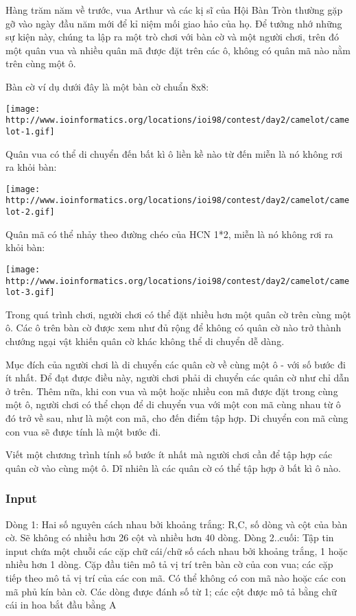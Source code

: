 

Hàng trăm năm về trước, vua Arthur và các kị sĩ của Hội Bàn Tròn thường gặp gỡ vào ngày đầu năm mới để kỉ niệm mối giao hảo của họ. Để tưởng nhớ những sự kiện này, chúng ta lập ra một trò chơi với bàn cờ và một người chơi, trên đó một quân vua và nhiều quân mã được đặt trên các ô, không có quân mã nào nằm trên cùng một ô.

Bàn cờ ví dụ dưới đây là một bàn cờ chuẩn 8x8:


\texttt{[image: http://www.ioinformatics.org/locations/ioi98/contest/day2/camelot/camelot-1.gif]}

Quân vua có thể di chuyển đến bất kì ô liền kề nào từ đến miễn là nó không rơi ra khỏi bàn:


\texttt{[image: http://www.ioinformatics.org/locations/ioi98/contest/day2/camelot/camelot-2.gif]}

Quân mã có thể nhảy theo đường chéo của HCN 1*2, miễn là nó không rơi ra khỏi bàn:


\texttt{[image: http://www.ioinformatics.org/locations/ioi98/contest/day2/camelot/camelot-3.gif]}

Trong quá trình chơi, người chơi có thể đặt nhiều hơn một quân cờ trên cùng một ô. Các ô trên bàn cờ được xem như đủ rộng để không có quân cờ nào trở thành chướng ngại vật khiến quân cờ khác không thể di chuyển dễ dàng.

Mục đích của người chơi là di chuyển các quân cờ về cùng một ô - với số bước đi ít nhất. Để đạt được điều này, người chơi phải di chuyển các quân cờ như chỉ dẫn ở trên. Thêm nữa, khi con vua và một hoặc nhiều con mã được đặt trong cùng một ô, người chơi có thể chọn để di chuyển vua với một con mã cùng nhau từ ô đó trở về sau, như là một con mã, cho đến điểm tập hợp. Di chuyển con mã cùng con vua sẽ được tính là một bước đi.

Viết một chương trình tính số bước ít nhất mà người chơi cần để tập hợp các quân cờ vào cùng một ô. Dĩ nhiên là các quân cờ có thể tập hợp ở bất kì ô nào.

\subsubsection{Input}

Dòng 1: Hai số nguyên cách nhau bởi khoảng trắng: R,C, số dòng và cột của bàn cờ. Sẽ không có nhiều hơn 26 cột và nhiều hơn 40 dòng. Dòng 2..cuối: Tập tin input chứa một chuỗi các cặp chữ cái/chữ số cách nhau bởi khoảng trắng, 1 hoặc nhiều hơn 1 dòng. Cặp đầu tiên mô tả vị trí trên bàn cờ của con vua; các cặp tiếp theo mô tả vị trí của các con mã. Có thể không có con mã nào hoặc các con mã phủ kín bàn cờ. Các dòng được đánh số từ 1; các cột được mô tả bằng chữ cái in hoa bắt đầu bằng A

